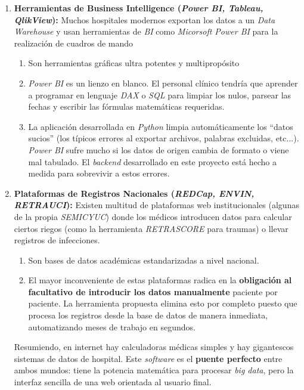 \begin{enumerate}
    \item \textbf{Herramientas de Business Intelligence (\textit{Power BI, Tableau, QlikView}):} Muchos hospitales modernos exportan los datos a un \textit{Data Warehouse} y usan herramientas de \textit{BI} como \textit{Micorsoft Power BI} para la realización de cuadros de mando
    \begin{enumerate}
        \item Son herramientas gráficas ultra potentes y multipropósito
        \item \textit{Power BI} es un lienzo en blanco. El personal clínico tendría que aprender a programar en lenguaje \textit{DAX} o \textit{SQL} para limpiar los nulos, parsear las fechas y escribir las fórmulas matemáticas requeridas.\cite{faddour2019bi}
        \item  La aplicación desarrollada en \textit{Python} limpia automáticamente los ``datos sucios'' (los típicos errores al exportar archivos, palabras excluidas, etc...). \textit{Power BI} sufre mucho si los datos de origen cambia de formato o viene mal tabulado. El \textit{backend} desarrollado en este proyecto está hecho a medida para sobrevivir a estos errores.
    \end{enumerate}

    \item \textbf{Plataformas de Registros Nacionales (\textit{REDCap, ENVIN, RETRAUCI}):} Existen multitud de plataformas web institucionales (algunas de la propia \textit{SEMICYUC}) donde los médicos introducen datos para calcular ciertos riegos (como la herramienta \textit{RETRASCORE} para traumas) o llevar registros de infecciones.
    \begin{enumerate}
        \item Son bases de datos académicas estandarizadas a nivel nacional.
        \item El mayor inconveniente de estas plataformas radica en la \textbf{obligación al facultativo de introducir los datos manualmente} paciente por paciente. La herramienta propuesta elimina esto por completo puesto que procesa los registros desde la base de datos de manera inmediata, automatizando meses de trabajo en segundos.\cite{tahmasbian2020redcap} 
    \end{enumerate}

    Resumiendo, en internet hay calculadoras médicas simples y hay gigantescos sistemas de datos de hospital. Este \textit{software} es el \textbf{puente perfecto} entre ambos mundos: tiene la potencia matemática para procesar \textit{big data}, pero la interfaz sencilla de una web orientada al usuario final.
\end{enumerate}

